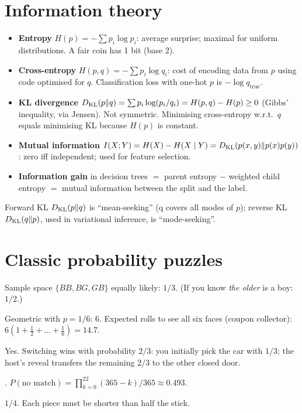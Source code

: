\section{Information theory}
\begin{itemize}
  \item \textbf{Entropy} $H(p)=-\sum p_i\log p_i$: average surprise; maximal for uniform distributions. A fair coin has 1 bit (base 2).
  \item \textbf{Cross-entropy} $H(p,q)=-\sum p_i\log q_i$: cost of encoding data from $p$ using code optimised for $q$. Classification loss with one-hot $p$ is $-\log q_{\text{true}}$.
  \item \textbf{KL divergence} $D_{\mathrm{KL}}(p\|q)=\sum p_i\log(p_i/q_i)=H(p,q)-H(p)\ge0$ (Gibbs' inequality, via Jensen). Not symmetric. Minimising cross-entropy w.r.t.\ $q$ equals minimising KL because $H(p)$ is constant.
  \item \textbf{Mutual information} $I(X;Y)=H(X)-H(X\mid Y)=D_{\mathrm{KL}}(p(x,y)\|p(x)p(y))$: zero iff independent; used for feature selection.
  \item \textbf{Information gain} in decision trees $=$ parent entropy $-$ weighted child entropy $=$ mutual information between the split and the label.
\end{itemize}
Forward KL $D_{\mathrm{KL}}(p\|q)$ is ``mean-seeking'' (q covers all modes of $p$); reverse KL $D_{\mathrm{KL}}(q\|p)$, used in variational inference, is ``mode-seeking''.

\section{Classic probability puzzles}
\A Sample space $\{BB,BG,GB\}$ equally likely: $1/3$. (If you know \emph{the older} is a boy: $1/2$.)

\A Geometric with $p=1/6$: 6. Expected rolls to see all six faces (coupon collector): $6(1+\tfrac12+\dots+\tfrac16)=14.7$.

\A Yes. Switching wins with probability $2/3$: you initially pick the car with $1/3$; the host's reveal transfers the remaining $2/3$ to the other closed door.

. $P(\text{no match})=\prod_{k=0}^{22}(365-k)/365\approx0.493$.

\A $1/4$. Each piece must be shorter than half the stick.

